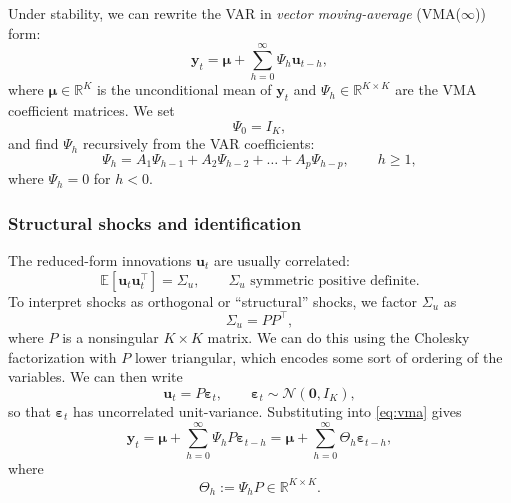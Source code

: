 \documentclass[11pt]{article}
\begin{document}
Under stability, we can rewrite the VAR in \emph{vector moving-average}
(VMA($\infty$)) form:
\begin{equation}
  \mathbf{y}_t
  = \boldsymbol{\mu}
  + \sum_{h=0}^{\infty} \Psi_h \mathbf{u}_{t-h},
  \label{eq:vma}
\end{equation}
where $\boldsymbol{\mu} \in \mathbb{R}^K$ is the unconditional mean of
$\mathbf{y}_t$ and $\Psi_h \in \mathbb{R}^{K \times K}$ are the VMA
coefficient matrices.
We set
\begin{equation}
  \Psi_0 = I_K,
\end{equation}
and find $\Psi_h$ recursively from the VAR coefficients:
\begin{equation}
  \Psi_h
  = A_1 \Psi_{h-1}
    + A_2 \Psi_{h-2}
    + \dots
    + A_p \Psi_{h-p},
  \qquad h \ge 1,
  \label{eq:psi-recursion}
\end{equation}
where $\Psi_h = 0$ for $h < 0$.

\subsubsection{Structural shocks and identification}

The reduced-form innovations $\mathbf{u}_t$ are usually correlated:
\begin{equation}
  \mathbb{E}[\mathbf{u}_t \mathbf{u}_t^\top] = \Sigma_u,
  \qquad \Sigma_u \text{ symmetric positive definite.}
\end{equation}
To interpret shocks as orthogonal or ``structural'' shocks, we factor
$\Sigma_u$ as
\begin{equation}
  \Sigma_u = P P^\top,
\end{equation}
where $P$ is a nonsingular $K \times K$ matrix.
We can do this using the Cholesky factorization with $P$ lower triangular,
which encodes some sort of ordering of the variables.
We can then write
\begin{equation}
  \mathbf{u}_t
  = P \boldsymbol{\varepsilon}_t,
  \qquad
  \boldsymbol{\varepsilon}_t \sim \mathcal{N}(\mathbf{0}, I_K),
\end{equation}
so that $\boldsymbol{\varepsilon}_t$ has uncorrelated unit-variance.
Substituting into \cref{eq:vma} gives
\begin{equation}
  \mathbf{y}_t
  = \boldsymbol{\mu}
  + \sum_{h=0}^{\infty} \Psi_h P \boldsymbol{\varepsilon}_{t-h}
  = \boldsymbol{\mu}
  + \sum_{h=0}^{\infty} \Theta_h \boldsymbol{\varepsilon}_{t-h},
\end{equation}
where
\begin{equation}
  \Theta_h := \Psi_h P \in \mathbb{R}^{K \times K}.
\end{equation}
\end{document}

